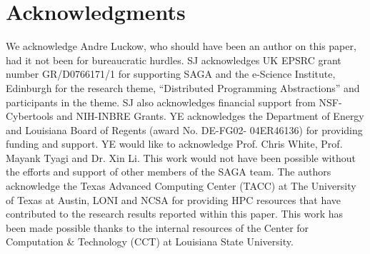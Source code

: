 \documentclass[conference,final]{IEEEtran}
\begin{document}

\section{Acknowledgments}
We acknowledge Andre Luckow, who should have been an author on this
paper, had it not been for bureaucratic hurdles.  SJ acknowledges UK
EPSRC grant number GR/D0766171/1 for supporting SAGA and the e-Science
Institute, Edinburgh for the research theme, ``Distributed Programming
Abstractions'' and participants in the theme. SJ also acknowledges
financial support from NSF-Cybertools and NIH-INBRE Grants. YE
acknowledges the Department of Energy and Louisiana Board of Regents
(award No. DE-FG02- 04ER46136) for providing funding and support. YE
would like to acknowledge Prof. Chris White, Prof. Mayank Tyagi and
Dr. Xin Li. This work would not have been possible without the efforts
and support of other members of the SAGA team. The authors acknowledge
the Texas Advanced Computing Center (TACC) at The University of Texas
at Austin, LONI and NCSA for providing HPC resources that have
contributed to the research results reported within this paper. This
work has been made possible thanks to the internal resources of the
Center for Computation \& Technology (CCT) at Louisiana State
University.

 

\end{document}
